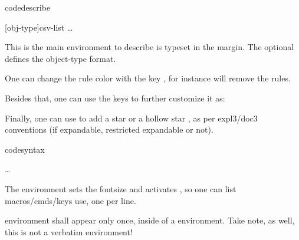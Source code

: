 \documentclass{article}
\begin{document}
\begin{codedescribe}[env,new=2023/05/01,update=2023/05/1,note={this is an example}]{codedescribe}
\begin{codesyntax}
\tsmacro{\begin{codedescribe}}[obj-type]{csv-list}
\ldots
\tsmacro{\end{codedescribe}}{}
\end{codesyntax}
This is the main environment to describe    is typeset in the margin. The optional  defines the object-type format. 
\end{codedescribe}
\begin{tsremark}[Note~1:]
One can change the rule color with the key , for instance \tsmacro{\begin{codedescribe}[rulecolor=white]}{} will remove the rules.
\end{tsremark}
\begin{tsremark}[Note~2:]
Besides that, one can use the keys  to further customize it as: \tsverb{\begin{codedescribe} [new=2023/05/01, update=2023/05/1, note={this is an example}]}
\end{tsremark}

\begin{tsremark}[Note~3:]
Finally, one can use  to add a star  or a hollow star , as per expl3/doc3 conventions (if expandable, restricted expandable or not).
\end{tsremark}

\begin{codedescribe}[env]{codesyntax}
\begin{codesyntax}
\tsmacro{\begin{codesyntax}}{}
\ldots
\tsmacro{\end{codesyntax}}{}
\end{codesyntax}
The  environment sets the fontsize and activates \tsmacro{\obeylines,\obeyspaces}{}, so one can list macros/cmds/keys use, one per line.
\end{codedescribe}
\begin{tsremark}
 environment shall appear only once, inside of a  environment. Take note, as well, this is not a verbatim environment!
%
\end{tsremark}
\end{document}
